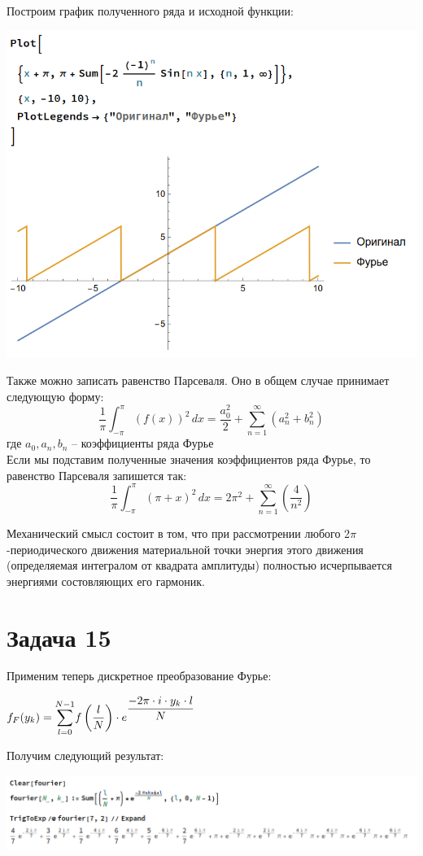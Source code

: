 \documentclass[14pt,fleqn]{extarticle}
\begin{document}
	Построим график полученного ряда и исходной функции:
	\begin{center}
		\includegraphics[scale=0.5]{plot}
	\end{center}
	Также можно записать равенство Парсеваля. Оно в общем случае принимает следующую форму:
	\[ \dfrac{1}{\pi} \int_{-\pi}^{\pi} (f(x))^2 \,dx = \dfrac{a_0^2}{2}+\sum_{n=1}^{\infty}(a_n^2+b_n^2) \]
	где $a_0, a_n, b_n$ -- коэффициенты ряда Фурье\\
	Если мы подставим полученные значения коэффициентов ряда Фурье, то равенство Парсеваля запишется так:
	\[ \dfrac{1}{\pi} \int_{-\pi}^{\pi} (\pi+x)^2 \,dx = 2 \pi^2+\sum_{n=1}^{\infty}\left(\dfrac{4}{n^2}\right) \]
	
	Механический смысл состоит в том, что при рассмотрении любого 2$\pi$-периодического движения материальной точки энергия этого движения (определяемая интегралом от квадрата амплитуды) полностью исчерпывается энергиями состовляющих его гармоник.
	
	\newpage
	\section*{Задача 15}
	Применим теперь дискретное преобразование Фурье:\\
	\begin{center}
		$f_F(y_k) = \smashoperator[r]{\sum_{l=0}^{N-1}} f\left(\dfrac{l}{N}\right) \cdot e^{\dfrac{-2\pi \cdot i \cdot y_k \cdot l}{N}}$
	\end{center}
	Получим следующий результат:
	\begin{center}
		\includegraphics[scale=0.5]{fourier}
	\end{center}
\end{document}
